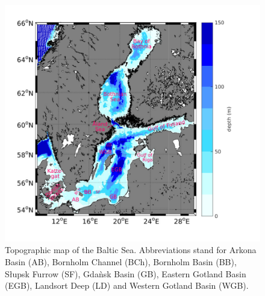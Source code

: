  \begin{figure}[ht]
  \flushleft
  \includegraphics[width=17cm]{bilder/baltic.pdf}
  \caption{Topographic map of the Baltic Sea. Abbreviations stand for Arkona 
 Basin (AB), Bornholm Channel (BCh), Bornholm Basin (BB), S\l upsk Furrow (SF), 
 Gda\`{n}sk Basin (GB), Eastern Gotland Basin (EGB), Landsort Deep (LD) and 
 Western Gotland Basin (WGB).}\label{balticmap}
 \end{figure}
 
